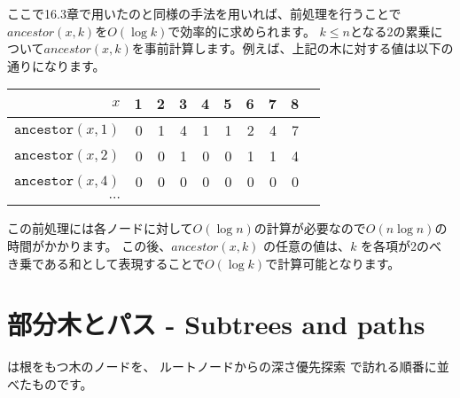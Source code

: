ここで16.3章で用いたのと同様の手法を用いれば、前処理を行うことで$ancestor(x, k)$を$O(\log k)$で効率的に求められます。
$k \le n$となる$2$の累乗について$ancestor(x, k)$を事前計算します。例えば、上記の木に対する値は以下の通りになります。

\begin{center}
\begin{tabular}{r|rrrrrrrrr}
$x$ & 1 & 2 & 3 & 4 & 5 & 6 & 7 & 8 \\
\hline
$\texttt{ancestor}(x,1)$ & 0 & 1 & 4 & 1 & 1 & 2 & 4 & 7 \\
$\texttt{ancestor}(x,2)$ & 0 & 0 & 1 & 0 & 0 & 1 & 1 & 4 \\
$\texttt{ancestor}(x,4)$ & 0 & 0 & 0 & 0 & 0 & 0 & 0 & 0 \\
$\cdots$ \\
\end{tabular}
\end{center}

この前処理には各ノードに対して$O(\log n)$の計算が必要なので$O(n \log n)$の時間がかかります。
この後、$ancestor(x, k)$ の任意の値は、$k$ を各項が2のべき乗である和として表現することで$O(\log k)$で計算可能となります。

\section{部分木とパス - Subtrees and paths}


は根をもつ木のノードを、
ルートノードからの深さ優先探索 で訪れる順番に並べたものです。

